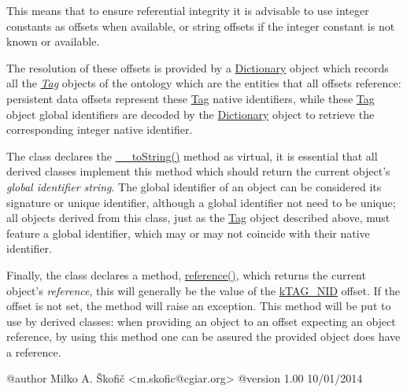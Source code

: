 This means that to ensure referential integrity it is advisable to use integer constants as offsets when available, or string offsets if the integer constant is not known or available.

The resolution of these offsets is provided by a \hyperlink{class_ontology_wrapper_1_1_dictionary}{Dictionary} object which records all the {\itshape \hyperlink{class_ontology_wrapper_1_1_tag}{Tag}} objects of the ontology which are the entities that all offsets reference\-: persistent data offsets represent these \hyperlink{class_ontology_wrapper_1_1_tag}{Tag} native identifiers, while these \hyperlink{class_ontology_wrapper_1_1_tag}{Tag} object global identifiers are decoded by the \hyperlink{class_ontology_wrapper_1_1_dictionary}{Dictionary} object to retrieve the corresponding integer native identifier.

The class declares the \hyperlink{class_ontology_wrapper_1_1_ontology_object_aa3f8d87842ea2c3a50b3e760adb2224f}{\-\_\-\-\_\-to\-String()} method as virtual, it is essential that all derived classes implement this method which should return the current object's {\itshape global identifier string}. The global identifier of an object can be considered its signature or unique identifier, although a global identifier not need to be unique; all objects derived from this class, just as the \hyperlink{class_ontology_wrapper_1_1_tag}{Tag} object described above, must feature a global identifier, which may or may not coincide with their native identifier.

Finally, the class declares a method, \hyperlink{class_ontology_wrapper_1_1_ontology_object_a638db42a659f1e43a869312d5d85f991}{reference()}, which returns the current object's {\itshape reference}, this will generally be the value of the \hyperlink{}{k\-T\-A\-G\-\_\-\-N\-I\-D} offset. If the offset is not set, the method will raise an exception. This method will be put to use by derived classes\-: when providing an object to an offset expecting an object reference, by using this method one can be assured the provided object does have a reference. \begin{DoxyVerb} @author            Milko A. Škofič <m.skofic@cgiar.org>
 @version   1.00 10/01/2014\end{DoxyVerb}
 

